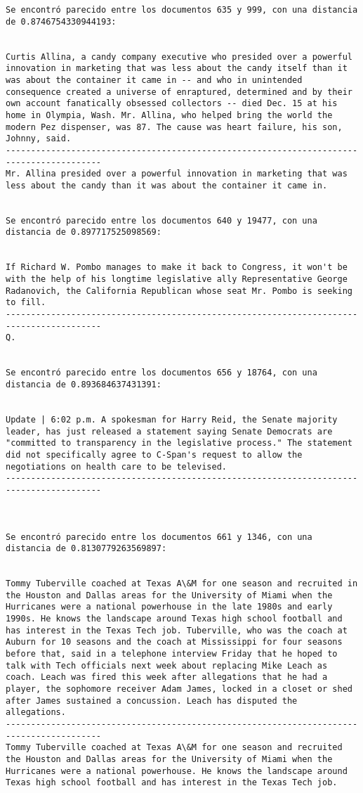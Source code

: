 \documentclass[11pt]{article}
\begin{document}
\begin{Verbatim}[commandchars=\\\{\}]
Se encontró parecido entre los documentos 635 y 999, con una distancia de 0.8746754330944193:


Curtis Allina, a candy company executive who presided over a powerful innovation in marketing that was less about the candy itself than it was about the container it came in -- and who in unintended consequence created a universe of enraptured, determined and by their own account fanatically obsessed collectors -- died Dec. 15 at his home in Olympia, Wash. Mr. Allina, who helped bring the world the modern Pez dispenser, was 87. The cause was heart failure, his son, Johnny, said.
-----------------------------------------------------------------------------------------
Mr. Allina presided over a powerful innovation in marketing that was less about the candy than it was about the container it came in.


Se encontró parecido entre los documentos 640 y 19477, con una distancia de 0.897717525098569:


If Richard W. Pombo manages to make it back to Congress, it won't be with the help of his longtime legislative ally Representative George Radanovich, the California Republican whose seat Mr. Pombo is seeking to fill.
-----------------------------------------------------------------------------------------
Q.


Se encontró parecido entre los documentos 656 y 18764, con una distancia de 0.893684637431391:


Update | 6:02 p.m. A spokesman for Harry Reid, the Senate majority leader, has just released a statement saying Senate Democrats are "committed to transparency in the legislative process." The statement did not specifically agree to C-Span's request to allow the negotiations on health care to be televised.
-----------------------------------------------------------------------------------------



Se encontró parecido entre los documentos 661 y 1346, con una distancia de 0.8130779263569897:


Tommy Tuberville coached at Texas A\&M for one season and recruited in the Houston and Dallas areas for the University of Miami when the Hurricanes were a national powerhouse in the late 1980s and early 1990s. He knows the landscape around Texas high school football and has interest in the Texas Tech job. Tuberville, who was the coach at Auburn for 10 seasons and the coach at Mississippi for four seasons before that, said in a telephone interview Friday that he hoped to talk with Tech officials next week about replacing Mike Leach as coach. Leach was fired this week after allegations that he had a player, the sophomore receiver Adam James, locked in a closet or shed after James sustained a concussion. Leach has disputed the allegations.
-----------------------------------------------------------------------------------------
Tommy Tuberville coached at Texas A\&M for one season and recruited the Houston and Dallas areas for the University of Miami when the Hurricanes were a national powerhouse. He knows the landscape around Texas high school football and has interest in the Texas Tech job.



\end{Verbatim}
\end{document}
